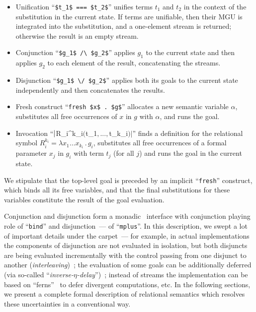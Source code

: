 \begin{itemize}
\item Unification ``\lstinline|$t_1$ === $t_2$|'' unifies terms $t_1$ and $t_2$ in the context of the substitution in the current state. If terms are unifiable,
  then their MGU is integrated into the substitution, and a one-element stream is returned; otherwise the result is an empty stream.
\item Conjunction ``\lstinline|$g_1$ /\ $g_2$|'' applies $g_1$ to the current state and then applies $g_2$ to each element of the result, concatenating
  the streams.
\item Disjunction ``\lstinline|$g_1$ \/ $g_2$|'' applies both its goals to the current state independently and then concatenates the results.
\item Fresh construct ``\lstinline|fresh $x$ . $g$|'' allocates a new semantic variable $\alpha$, substitutes all free occurrences of $x$ in $g$ with $\alpha$, and
  runs the goal.
\item Invocation ``$\lstinline|$R_i^{k_i}$ ($t_1$,...,$t_{k_i}$)|$'' finds a definition for the relational symbol \mbox{$R_i^{k_i}=\lambda x_1\dots x_{k_i}\,.\,g_i$}, substitutes
  all free occurrences of a formal parameter $x_j$ in $g_i$ with term $t_j$ (for all $j$) and runs the goal in the current state.
\end{itemize}

We stipulate that the top-level goal is preceded by an implicit ``\lstinline|fresh|'' construct, which binds all its free variables, and that the final substitutions
for these variables constitute the result of the goal evaluation.

Conjunction and disjunction form a monadic~\cite{Monads} interface with conjunction playing role of ``\lstinline|bind|'' and disjunction~--- of ``\lstinline|mplus|''.
In this description, we swept a lot of important details under the carpet~--- for example, in actual implementations the components of disjunction are not evaluated in
isolation, but both disjuncts are being evaluated incrementally with the control passing from one disjunct to another (\emph{interleaving})~\cite{Search};
the evaluation of some goals can be additionally deferred (via so-called ``\emph{inverse-$\eta$-delay}'')~\cite{MicroKanren}; instead of streams
the implementation can be based on ``ferns''~\cite{BottomAvoiding} to defer divergent computations, etc. In the following sections, we present
a complete formal description of relational semantics which resolves these uncertainties in a conventional way.

